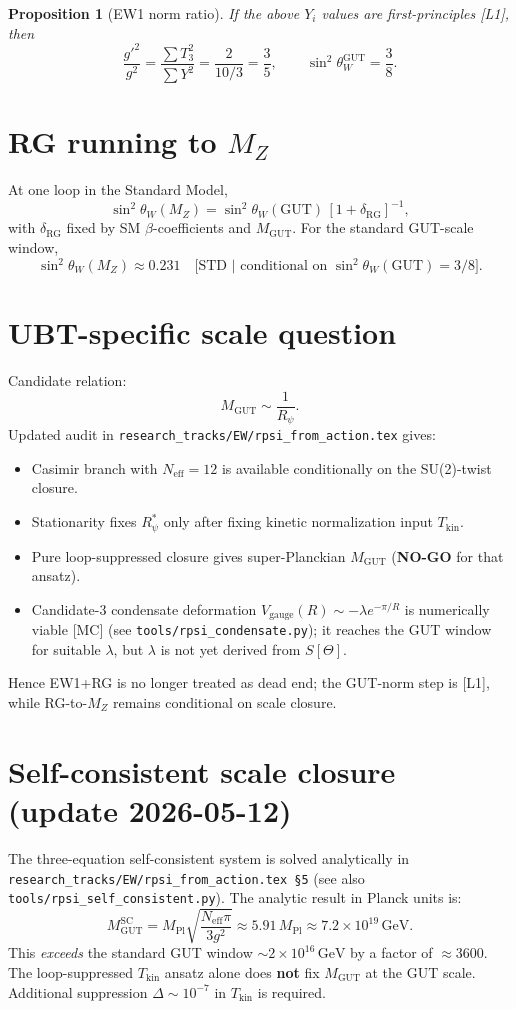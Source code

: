 \documentclass[12pt,a4paper]{article}
\newtheorem{proposition}{Proposition}[section]
\begin{document}
\begin{proposition}[EW1 norm ratio]
If the above $Y_i$ values are first-principles [L1], then
\[
\frac{g'^2}{g^2}
= \frac{\sum T_3^2}{\sum Y^2}
= \frac{2}{10/3}
= \frac35,
\qquad
\sin^2\theta_W^{\mathrm{GUT}}=\frac{3}{8}.
\]
\end{proposition}

\section{RG running to $M_Z$}
At one loop in the Standard Model,
\[
\sin^2\theta_W(M_Z)
=
\sin^2\theta_W(\mathrm{GUT})\,[1+\delta_{\mathrm{RG}}]^{-1},
\]
with $\delta_{\mathrm{RG}}$ fixed by SM $\beta$-coefficients and
$M_{\mathrm{GUT}}$.
For the standard GUT-scale window,
\[
\sin^2\theta_W(M_Z)\approx 0.231
\quad\text{[STD | conditional on } \sin^2\theta_W(\mathrm{GUT})=3/8\text{]}.
\]

\section{UBT-specific scale question}
Candidate relation:
\[
M_{\mathrm{GUT}}\sim \frac{1}{R_\psi}.
\]
Updated audit in \texttt{research\_tracks/EW/rpsi\_from\_action.tex} gives:
\begin{itemize}
  \item Casimir branch with $N_{\mathrm{eff}}=12$ is available conditionally on the SU(2)-twist closure.
  \item Stationarity fixes $R_\psi^*$ only after fixing kinetic normalization input $T_{\mathrm{kin}}$.
  \item Pure loop-suppressed closure gives super-Planckian $M_{\mathrm{GUT}}$ (\textbf{NO-GO} for that ansatz).
  \item Candidate-3 condensate deformation
  $V_{\mathrm{gauge}}(R)\sim-\lambda e^{-\pi/R}$ is numerically viable [MC]
  (see \texttt{tools/rpsi\_condensate.py}); it reaches the GUT window for
  suitable $\lambda$, but $\lambda$ is not yet derived from $S[\Theta]$.
\end{itemize}
Hence EW1+RG is no longer treated as dead end; the GUT-norm step is [L1], while RG-to-$M_Z$ remains conditional on scale closure.

\section{Self-consistent scale closure (update 2026-05-12)}
\label{sec:sc}

The three-equation self-consistent system is solved analytically in
\texttt{research\_tracks/EW/rpsi\_from\_action.tex \S5}
(see also \texttt{tools/rpsi\_self\_consistent.py}).
The analytic result in Planck units is:
\[
M_{\mathrm{GUT}}^{\mathrm{SC}} = M_{\mathrm{Pl}}\sqrt{\frac{N_{\mathrm{eff}}\pi}{3g^2}}
\approx 5.91\,M_{\mathrm{Pl}}\approx 7.2\times10^{19}\,\mathrm{GeV}.
\]
This \emph{exceeds} the standard GUT window $\sim2\times10^{16}\,\mathrm{GeV}$
by a factor of $\approx3600$.
The loop-suppressed $T_{\mathrm{kin}}$ ansatz alone does \textbf{not} fix
$M_{\mathrm{GUT}}$ at the GUT scale.
Additional suppression $\Delta\sim10^{-7}$ in $T_{\mathrm{kin}}$ is required.
\end{document}
